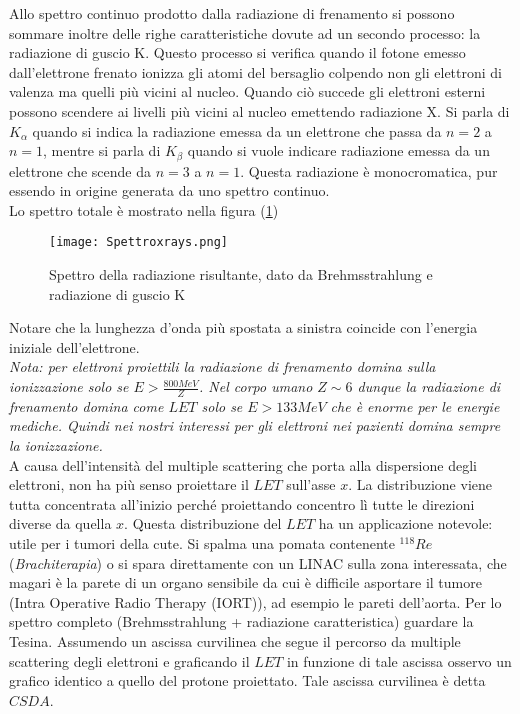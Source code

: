 \documentclass [a4paper, twoside] {book}
\begin{document}
Allo spettro continuo prodotto dalla radiazione di frenamento si possono sommare inoltre delle righe caratteristiche dovute ad un secondo processo: la radiazione di guscio K. 
Questo processo si verifica quando il fotone emesso dall'elettrone frenato ionizza gli atomi del bersaglio colpendo non gli elettroni di valenza ma quelli più vicini al nucleo. Quando ciò succede gli elettroni esterni possono scendere ai livelli più vicini al nucleo emettendo radiazione X. Si parla di $K_{\alpha}$ quando si indica la radiazione emessa da un elettrone che passa da $n=2$ a $n=1$, mentre si parla di $K_{\beta}$ quando si vuole indicare radiazione emessa da un elettrone che scende da $n=3$ a $n=1$. Questa radiazione è monocromatica, pur essendo in origine generata da uno spettro continuo.\\

Lo spettro totale è mostrato nella figura (\ref{brehmspect})

\begin{figure} []
\centering
		\texttt{[image: Spettroxrays.png]}
		\caption{Spettro della radiazione risultante, dato da Brehmsstrahlung e radiazione di guscio K}
         \label{brehmspect}
\end{figure}

Notare che la lunghezza d'onda più spostata a sinistra coincide con l'energia iniziale dell'elettrone.\\

\emph{Nota: per elettroni proiettili la radiazione di frenamento domina sulla ionizzazione solo se $E>\frac{800 MeV}{Z}$. Nel corpo umano $Z\sim6$ dunque la radiazione di frenamento domina come $LET$ solo se $E>133 MeV$ che è enorme per le energie mediche. Quindi nei nostri interessi per gli elettroni nei pazienti domina sempre la ionizzazione.}\\

A causa dell'intensità del multiple scattering che porta alla dispersione degli elettroni, non ha più senso proiettare il $LET$ sull'asse $x$. La distribuzione viene tutta concentrata all'inizio perché proiettando concentro lì tutte le direzioni diverse da quella $x$.
Questa distribuzione del $LET$ ha un applicazione notevole: utile per i tumori della cute. Si spalma una pomata contenente $^{118}Re$ (\emph{Brachiterapia}\cite{Brachioterapia}) o si spara direttamente con un LINAC sulla zona interessata, che magari è la parete di un organo sensibile da cui è difficile asportare il tumore (Intra Operative Radio Therapy (IORT)\cite{Intraoperative probes}), ad esempio le pareti dell'aorta.
Per lo spettro completo (Brehmsstrahlung + radiazione caratteristica) guardare la Tesina.
Assumendo un ascissa curvilinea che segue il percorso da multiple scattering degli elettroni e graficando il $LET$ in funzione di tale ascissa osservo un grafico identico a quello del protone proiettato. Tale ascissa curvilinea è detta $CSDA$.
\end{document}
